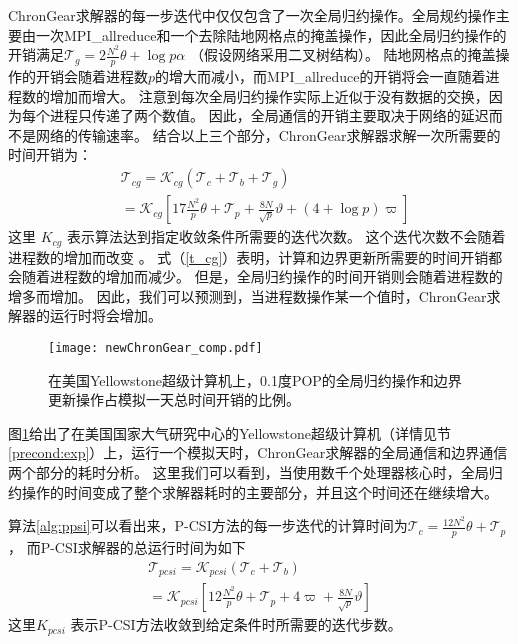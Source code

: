  
ChronGear求解器的每一步迭代中仅仅包含了一次全局归约操作。全局规约操作主要由一次MPI\_allreduce和一个去除陆地网格点的掩盖操作，因此全局归约操作的开销满足$\mathcal{T}_g= 2\frac{N^2}{p}\theta + \log p \alpha$ （假设网络采用二叉树结构）。 
陆地网格点的掩盖操作的开销会随着进程数$p$的增大而减小，而MPI\_allreduce的开销将会一直随着进程数的增加而增大。 
注意到每次全局归约操作实际上近似于没有数据的交换，因为每个进程只传递了两个数值。
因此，全局通信的开销主要取决于网络的延迟而不是网络的传输速率。
结合以上三个部分，ChronGear求解器求解一次所需要的时间开销为：
\begin{eqnarray}
\label{t_cg}
&\mathcal{T}_{cg}=\mathcal{K}_{cg} (\mathcal{T}_c + \mathcal{T}_b+\mathcal{T}_g )\nonumber \\
&=\mathcal{K}_{cg} [17 \frac{N^2}{p}\theta + \mathcal{T}_{p} +\frac{8N}{\sqrt{p}}\vartheta +(4+\log p)\varpi]
\end{eqnarray}
这里 $K_{cg}$ 表示算法达到指定收敛条件所需要的迭代次数。
这个迭代次数不会随着进程数的增加而改变 \cite{hu2013scalable}。 
式（\ref{t_cg}）表明，计算和边界更新所需要的时间开销都会随着进程数的增加而减少。 
但是，全局归约操作的时间开销则会随着进程数的增多而增加。 
因此，我们可以预测到，当进程数操作某一个值时，ChronGear求解器的运行时将会增加。 

\begin{figure}[!t]
\begin{center}
	\texttt{[image: newChronGear\_comp.pdf]}
\caption[] {在美国Yellowstone超级计算机上，0.1度POP的全局归约操作和边界更新操作占模拟一天总时间开销的比例。}
\label{fig:ChronGearCOMP}
\end{center}
\end{figure}
 
图\ref{fig:ChronGearCOMP}给出了在美国国家大气研究中心的Yellowstone超级计算机（详情见节\ref{precond:exp}）上，运行一个模拟天时，ChronGear求解器的全局通信和边界通信两个部分的耗时分析。 
这里我们可以看到，当使用数千个处理器核心时，全局归约操作的时间变成了整个求解器耗时的主要部分，并且这个时间还在继续增大。



算法\ref{alg:ppsi}可以看出来，P-CSI方法的每一步迭代的计算时间为$\mathcal{T}_c =\frac{12N^2}{p}\theta+\mathcal{T}_p$， 
而P-CSI求解器的总运行时间为如下
\begin{eqnarray}
\label{t_psi}
\mathcal{T}_{pcsi} = \mathcal{K}_{pcsi}(\mathcal{T}_c + \mathcal{T}_b ) \nonumber \\
= \mathcal{K}_{pcsi}[12\frac{N^2}{p}\theta+ \mathcal{T}_p +4\varpi + \frac{8N}{ \sqrt{p}}\vartheta]
\end{eqnarray}
这里$K_{pcsi}$ 表示P-CSI方法收敛到给定条件时所需要的迭代步数。 



